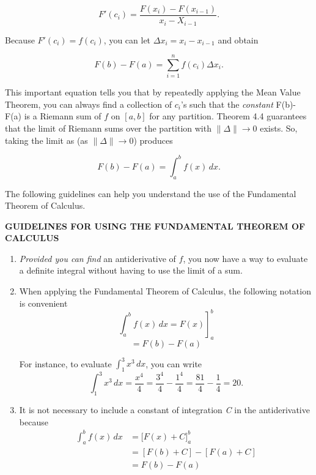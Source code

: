 \documentclass[oneside]{book}
\begin{document}
$$F'(c_i) = \frac{F(x_i) - F(x_{i-1})}{x_i - X_{i-1}}.$$

\noindent Because $F'(c_i) = f(c_i)$, you can let $\Delta x_i = x_i - x_{i-1}$ and obtain

$$ F(b)-F(a) = \sum_{i=1}^{n} f(c_i)\Delta x_i. $$

\noindent This important equation tells you that by repeatedly applying the Mean Value Theorem, you can always find a collection of $c_i$'s such that the \textit{constant} F(b)- F(a) is a Riemann sum of $f$ on $[a,b]$ for any partition. Theorem 4.4 guarantees that the limit of Riemann sums over the partition with $\| \Delta \| \to 0$ exists. So, taking the limit as (as $\| \Delta \| \to 0$) produces

$$ F(b) - F(a) = \int_{a}^{b} f(x) \,dx. $$

\bigskip

The following guidelines can help you understand the use of the Fundamental Theorem of Calculus.
\sffamily
\begin{tcolorbox}[colback = beige!75!white,
				  sharp corners = all,
				  colframe = beige!75!white]
\textbf{GUIDELINES FOR USING THE FUNDAMENTAL THEOREM OF CALCULUS}
\rmfamily
\begin{enumerate}
\item \textit{Provided you can find} an antiderivative of $f$, you now have a way to evaluate a definite integral without having to use the limit of a sum.

\item When applying the Fundamental Theorem of Calculus, the following notation is convenient
$$ \left. \int_{a}^{b} f(x) \,dx = F(x) \right]_a^b$$
$$ = F(b) - F(a) $$

For instance, to evaluate $ \int_{1}^{3} x^3 \,dx $, you can write
$$ \int_{1}^{3} x^3 \,dx = \frac{x^4}{4} = \frac{3^4}{4} - \frac{1^4}{4} = \frac{81}{4} - \frac{1}{4} = 20.$$

\item It is not necessary to include a constant of integration \textit{C} in the antiderivative because
\begin{align*}
\int_{a}^{b} f(x) \,dx &= \bigg[ F(x) + C \bigg]_a^b \\
  &= [F(b) + C] - [F(a) + C] \\
 &= F(b) - F(a) 
\end{align*}
\end{enumerate}
\end{tcolorbox}

\pagebreak
\end{document}
